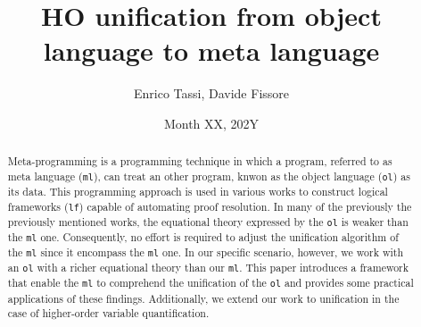 \documentclass{rapport}
\author{Enrico Tassi, Davide Fissore}
\title{HO unification from object language to meta language}
\date{Month XX, 202Y}
\begin{document}
\maketitle

\def\elpi{\proglang{elpi}}
\def\coqelpi{\proglang{coq-elpi}}
\def\lambdaprolog{\proglang{$\lambda$-prolog}}
\def\coq{\proglang{coq}}

\newcommand{\library}[1]{\textit{#1}\xspace}
\def\stdpp{\library{stdpp}}
\def\iris{\library{iris}}

\newcommand*{\acronym}[1]{\texttt{#1}\xspace}

\def\ol{\acronym{ol}} %
\def\ml{\acronym{ml}} %
\def\lf{\acronym{lf}} %
\def\ho{\acronym{ho}} %
\def\Forall{$\forall$}

\newcommand*{\eqtau}{\ensuremath{\mathrel{\overset{\mathrm{\tau}}{=}}}}
\begin{abstract}


  Meta-programming \cite{hill1994} is a programming technique in which a
  program, referred to as meta language (\ml), can treat an other program, knwon
  as the object language (\ol) as its data. This programming approach is used in
  various works \cite{cite1, cite2...} to construct logical frameworks (\lf)
  capable of automating proof resolution. In many of the previously the
  previously mentioned works, the equational theory expressed by the \ol is
  weaker than the \ml one. Consequently, no effort is required to adjust the
  unification algorithm of the \ml since it encompass the \ml one. In our
  specific scenario, however, we work with an \ol with a richer equational
  theory than our \ml. This paper introduces a framework that enable the \ml to
  comprehend the unification of the \ol and provides some practical applications
  of these findings. Additionally, we extend our work to unification in the case
  of higher-order variable quantification.

\end{abstract}
\end{document}
